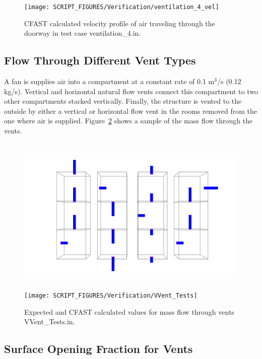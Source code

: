 \begin{figure}[!ht]
\centering
\texttt{[image: SCRIPT\_FIGURES/Verification/ventilation\_4\_vel]}
\caption[Results of the test case {\ct ventilation\_4.in}]{CFAST calculated velocity profile of air traveling through the doorway in test case {\ct ventilation\_4.in}.}
\label{fig:vel}
\end{figure}

\FloatBarrier

\subsection{Flow Through Different Vent Types}
\label{VVent_Tests}

A fan is supplies air into a compartment at a constant rate of 0.1 m$^3$/s (0.12 kg/s). Vertical and horizontal natural flow vents connect this compartment to two other compartments stacked vertically.  Finally, the structure is vented to the outside by either a vertical or horizontal flow vent in the rooms removed from the one where air is supplied. Figure~\ref{fig:vvent} shows a sample of the mass flow through the vents.

\begin{figure}
\begin{center}
\includegraphics[height=3.0in]{FIGURES/Verification/VVent_Geom} \\
\texttt{[image: SCRIPT\_FIGURES/Verification/VVent\_Tests]}
\end{center}
\caption[Results of the test case {\ct VVent\_Tests.in}]{Expected and CFAST calculated values for mass flow through vents {\ct VVent\_Tests.in}.}
\label{fig:vvent}
\end{figure}

\FloatBarrier

\subsection{Surface Opening Fraction for Vents}
\label{Surface_Opening_Fraction}

